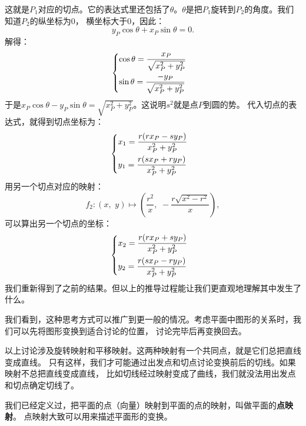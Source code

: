 \documentclass[12pt,UTF8,fontset=none]{ctexbook}
\begin{document}
这就是$P_1$对应的切点。它的表达式里还包括了$\theta$。$\theta$是把$P_1$旋转到$P_2$的角度。我们知道$P_2$的纵坐标为$0$，
横坐标大于$0$，因此：
$$ y_P \cos{\theta} + x_P\sin{\theta} = 0. $$
解得：
\begin{alignat*}{1}
&   \begin{dcases}
        \cos{\theta} = \frac{x_P}{\sqrt{x_P^2 + y_P^2}} \\
        \sin{\theta} = \frac{-y_P}{\sqrt{x_P^2 + y_P^2}} 
    \end{dcases}
\end{alignat*}
于是$x_P\cos{\theta} - y_P\sin{\theta} = \sqrt{x_P^2 + y_P^2}$。这说明$s^2$就是点$P$到圆的势。
代入切点的表达式，就得到切点坐标为：
\begin{alignat*}{1}
    &   \begin{dcases}
    x_1 = \frac{r(rx_P - sy_P) }{x_P^2+y_P^2} \\
    y_1 = \frac{r(sx_P + ry_P)}{x_P^2+y_P^2}
\end{dcases}
\end{alignat*}
用另一个切点对应的映射：
$$f_2: (x,\,\, y) \mapsto \left(\frac{r^2}{x},\,\, -\frac{r\sqrt{x^2 - r^2}}{x}\right),$$
可以算出另一个切点的坐标：
\begin{alignat*}{1}
    &   \begin{dcases}
        x_2 = \frac{r(rx_P + sy_P) }{x_P^2+y_P^2} \\
        y_2 = \frac{r(sx_P - ry_P)}{x_P^2+y_P^2}
    \end{dcases}
\end{alignat*}
我们重新得到了之前的结果。但以上的推导过程能让我们更直观地理解其中发生了什么。

我们看到，这种思考方式可以推广到更一般的情况。考虑平面中图形的关系时，我们可以先将图形变换到适合讨论的位置，
讨论完毕后再变换回去。

以上讨论涉及旋转映射和平移映射。这两种映射有一个共同点，就是它们总把直线变成直线。
只有这样，我们才可能通过出发点和切点讨论变换前后的切线。如果映射不总把直线变成直线，
比如切线经过映射变成了曲线，我们就没法用出发点和切点确定切线了。

我们已经定义过，把平面的点（向量）映射到平面的点的映射，叫做平面的\textbf{点映射}。
点映射大致可以用来描述平面形的变换。
\end{document}
